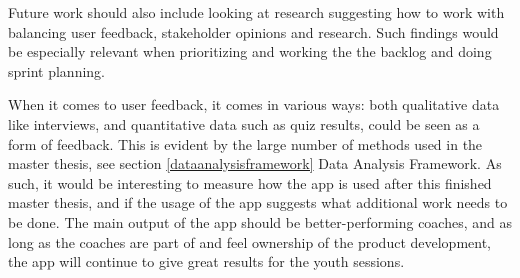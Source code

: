 Future work should also include looking at research suggesting how to work with balancing user feedback, stakeholder opinions and research. Such findings would be especially relevant when prioritizing and working the the backlog and doing sprint planning.

When it comes to user feedback, it comes in various ways: both qualitative data like interviews, and quantitative data such as quiz results, could be seen as a form of feedback. This is evident by the large number of methods used in the master thesis, see section \ref{dataanalysisframework} Data Analysis Framework. As such, it would be interesting to measure how the app is used after this finished master thesis, and if the usage of the app suggests what additional work needs to be done. The main output of the app should be better-performing coaches, and as long as the coaches are part of and feel ownership of the product development, the app will continue to give great results for the youth sessions.


